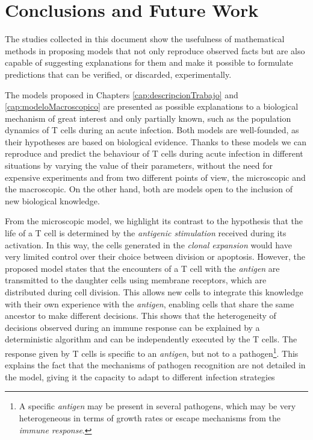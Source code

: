 \chapter{Conclusions and Future Work}
\label{cap:conclusions}

The studies collected in this document show the usefulness of mathematical methods in proposing models that not only reproduce observed facts but are also capable of suggesting explanations for them and make it possible to formulate predictions that can be verified, or discarded, experimentally. 


The models proposed in Chapters \ref{cap:descripcionTrabajo} and \ref{cap:modeloMacroscopico} are presented as possible explanations to a biological mechanism of great interest and only partially known, such as the population dynamics of T cells during an acute infection. Both models are well-founded, as their hypotheses are based on biological evidence. Thanks to these models we can reproduce and predict the behaviour of T cells during acute infection in different situations by varying the value of their parameters, without the need for expensive experiments and from two different points of view, the microscopic and the macroscopic. On the other hand, both are models open to the inclusion of new biological knowledge. 


From the microscopic model, we highlight its contrast to the hypothesis that the life of a T cell is determined by the \textit{antigenic stimulation} received during its activation. In this way, the cells generated in the \textit{clonal expansion} would have very limited control over their choice between division or apoptosis. However, the proposed model states that the encounters of a T cell with the \textit{antigen} are transmitted to the daughter cells using membrane receptors, which are distributed during cell division. This allows new cells to integrate this knowledge with their own experience with the \textit{antigen}, enabling cells that share the same ancestor to make different decisions. This shows that the heterogeneity of decisions observed during an immune response can be explained by a deterministic algorithm and can be independently executed by the T cells. The response given by T cells is specific to an \textit{antigen}, but not to a pathogen\footnote{A specific \textit{antigen} may be present in several pathogens, which may be very heterogeneous in terms of growth rates or escape mechanisms from the \textit{immune response}.}. This explains the fact that the mechanisms of pathogen recognition are not detailed in the model, giving it the capacity to adapt to different infection strategies \citep{JTB}


